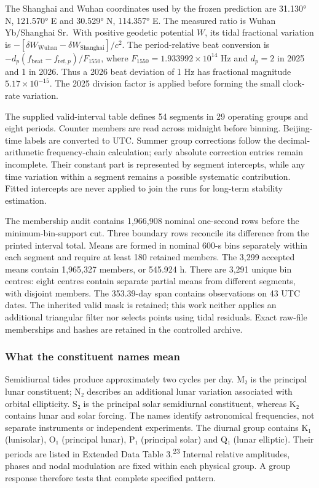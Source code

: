 \documentclass[
  10pt,
  a4paper,
]{article}
\begin{document}
The Shanghai and Wuhan coordinates used by the frozen prediction are
31.130° N, 121.570° E and 30.529° N, 114.357° E. The measured ratio is
Wuhan Yb/Shanghai Sr.~With positive geodetic potential \(W\), its tidal
fractional variation is
\(-[\delta W_{\mathrm{Wuhan}}-\delta W_{\mathrm{Shanghai}}]/c^2\). The
period-relative beat conversion is
\(-d_p(f_{\mathrm{beat}}-f_{{\mathrm{ref}},p})/F_{1550}\), where
\(F_{1550}=1.933992\times10^{14}\) Hz and \(d_p=2\) in 2025 and 1 in
2026. Thus a 2026 beat deviation of 1 Hz has fractional magnitude
\(5.17\times10^{-15}\). The 2025 division factor is applied before
forming the small clock-rate variation.

The supplied valid-interval table defines 54 segments in 29 operating
groups and eight periods. Counter members are read across midnight
before binning. Beijing-time labels are converted to UTC. Summer group
corrections follow the decimal-arithmetic frequency-chain calculation;
early absolute correction entries remain incomplete. Their constant part
is represented by segment intercepts, while any time variation within a
segment remains a possible systematic contribution. Fitted intercepts
are never applied to join the runs for long-term stability estimation.

The membership audit contains 1,966,908 nominal one-second rows before
the minimum-bin-support cut. Three boundary rows reconcile its
difference from the printed interval total. Means are formed in nominal
600-s bins separately within each segment and require at least 180
retained members. The 3,299 accepted means contain 1,965,327 members, or
545.924 h. There are 3,291 unique bin centres: eight centres contain
separate partial means from different segments, with disjoint members.
The 353.39-day span contains observations on 43 UTC dates. The inherited
valid mask is retained; this work neither applies an additional
triangular filter nor selects points using tidal residuals. Exact
raw-file memberships and hashes are retained in the controlled archive.

\hypertarget{what-the-constituent-names-mean}{%
\subsubsection{What the constituent names
mean}\label{what-the-constituent-names-mean}}

Semidiurnal tides produce approximately two cycles per day. M₂ is the
principal lunar constituent; N₂ describes an additional lunar variation
associated with orbital ellipticity. S₂ is the principal solar
semidiurnal constituent, whereas K₂ contains lunar and solar forcing.
The names identify astronomical frequencies, not separate instruments or
independent experiments. The diurnal group contains K₁ (lunisolar), O₁
(principal lunar), P₁ (principal solar) and Q₁ (lunar elliptic). Their
periods are listed in Extended Data Table 3.\textsuperscript{23}
Internal relative amplitudes, phases and nodal modulation are fixed
within each physical group. A group response therefore tests that
complete specified pattern.
\end{document}
